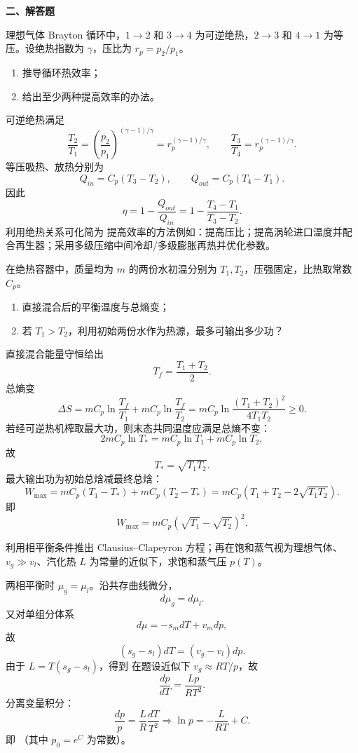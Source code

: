 \textbf{二、解答题}
\begin{question}
理想气体 Brayton 循环中，$1\to2$ 和 $3\to4$ 为可逆绝热，$2\to3$ 和 $4\to1$ 为等压。设绝热指数为 $\gamma$，压比为 $r_p=p_2/p_1$。
\begin{enumerate}[label=（\arabic*）,leftmargin=2.8em,itemsep=0.2em]
\item 推导循环热效率；
\item 给出至少两种提高效率的办法。
\end{enumerate}
\begin{solution}

可逆绝热满足
\[
\frac{T_2}{T_1}=\left(\frac{p_2}{p_1}\right)^{(\gamma-1)/\gamma}=r_p^{(\gamma-1)/\gamma},
\qquad
\frac{T_3}{T_4}=r_p^{(\gamma-1)/\gamma}.
\]
等压吸热、放热分别为
\[
Q_{in}=C_p(T_3-T_2),
\qquad
Q_{out}=C_p(T_4-T_1).
\]
因此
\[
\eta=1-\frac{Q_{out}}{Q_{in}}=1-\frac{T_4-T_1}{T_3-T_2}.
\]
利用绝热关系可化简为
提高效率的方法例如：提高压比；提高涡轮进口温度并配合再生器；采用多级压缩中间冷却/多级膨胀再热并优化参数。
\end{solution}
\end{question}

\begin{question}
在绝热容器中，质量均为 $m$ 的两份水初温分别为 $T_1,T_2$，压强固定，比热取常数 $C_p$。
\begin{enumerate}[label=（\arabic*）,leftmargin=2.8em,itemsep=0.2em]
\item 直接混合后的平衡温度与总熵变；
\item 若 $T_1>T_2$，利用初始两份水作为热源，最多可输出多少功？
\end{enumerate}
\begin{solution}

直接混合能量守恒给出
\[
T_f=\frac{T_1+T_2}{2}.
\]
总熵变
\[
\Delta S=mC_p\ln\frac{T_f}{T_1}+mC_p\ln\frac{T_f}{T_2}
=mC_p\ln\frac{(T_1+T_2)^2}{4T_1T_2}\ge0.
\]
若经可逆热机榨取最大功，则末态共同温度应满足总熵不变：
\[
2mC_p\ln T_* = mC_p\ln T_1+mC_p\ln T_2,
\]
故
\[
T_*=\sqrt{T_1T_2}.
\]
最大输出功为初始总焓减最终总焓：
\[
W_{\max}=mC_p(T_1-T_*)+mC_p(T_2-T_*)
= mC_p(T_1+T_2-2\sqrt{T_1T_2}).
\]
即
\[
W_{\max}=mC_p(\sqrt{T_1}-\sqrt{T_2})^2.
\]
\end{solution}
\end{question}

\begin{question}
利用相平衡条件推出 Clausius--Clapeyron 方程；再在饱和蒸气视为理想气体、$v_g\gg v_l$、汽化热 $L$ 为常量的近似下，求饱和蒸气压 $p(T)$。
\begin{solution}

两相平衡时 $\mu_g=\mu_l$。沿共存曲线微分，
\[
 d\mu_g=d\mu_l.
\]
又对单组分体系
\[
 d\mu=-s_m dT+v_m dp,
\]
故
\[
 (s_g-s_l)dT=(v_g-v_l)dp.
\]
由于 $L=T(s_g-s_l)$，得到
在题设近似下 $v_g\approx RT/p$，故
\[
\frac{dp}{dT}=\frac{Lp}{RT^2}.
\]
分离变量积分：
\[
\frac{dp}{p}=\frac{L}{R}\frac{dT}{T^2}
\Longrightarrow
\ln p=-\frac{L}{RT}+C.
\]
即
（其中 $p_0=e^C$ 为常数）。
\end{solution}
\end{question}

